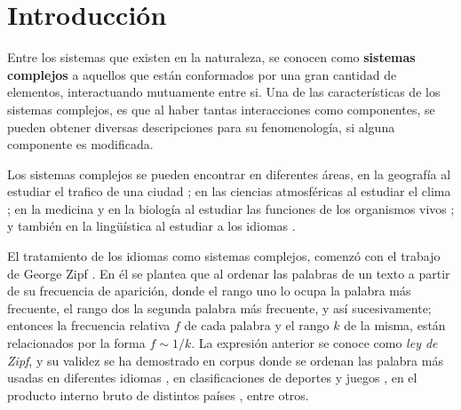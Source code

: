 \chapter{Introducción}

Entre los sistemas que existen en la naturaleza, se conocen como  \textbf{sistemas complejos} a aquellos que  están conformados por una gran cantidad de elementos, interactuando mutuamente entre si. Una de las características de los sistemas complejos, es que al haber tantas interacciones como componentes, se pueden obtener diversas descripciones para su fenomenología,  si alguna componente es modificada.





Los sistemas complejos se pueden encontrar en diferentes áreas,  en la geografía al estudiar el trafico de una ciudad \cite{complex_cities}; en las ciencias atmosféricas al estudiar el clima \cite{complex_climate};  en la medicina y en la biología al estudiar las funciones de los organismos vivos  \cite{complex_medicine}; y también en la lingüística al estudiar a los idiomas  \cite{complex_language} .

El tratamiento de los idiomas como sistemas complejos, comenzó con el trabajo de George Zipf \cite{zipf}. En él se plantea que al ordenar las palabras de un texto a partir de su frecuencia de aparición, donde el rango uno lo ocupa la palabra más frecuente, el rango dos la segunda palabra más frecuente, y así sucesivamente; entonces la frecuencia relativa $f$ de cada palabra y el rango $k$ de la misma, están relacionados por la forma $f\sim1/k$. La expresión anterior se conoce como \textit{ley de Zipf}, y su validez se ha demostrado en corpus donde se ordenan las palabra más usadas en diferentes idiomas \cite{tesis.sergio}, en clasificaciones de deportes y juegos \cite{epj}, en el producto interno bruto de distintos países \cite{zipf_gdp}, entre otros. 

